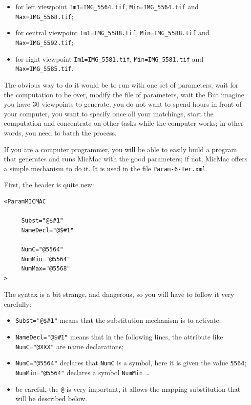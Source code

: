 \begin{itemize}
   \item  for left viewpoint {\tt Im1=IMG\_5564.tif}, {\tt Min=IMG\_5564.tif} and {\tt Max=IMG\_5568.tif};
   \item  for central viewpoint {\tt Im1=IMG\_5588.tif}, {\tt Min=IMG\_5588.tif} and {\tt Max=IMG\_5592.tif};
   \item  for right viewpoint {\tt Im1=IMG\_5581.tif}, {\tt Min=IMG\_5581.tif} and {\tt Max=IMG\_5585.tif}.
\end{itemize}


The obvious way to do it would be to run with one set of parameters, wait for the computation to be over,
modify the file of parameters, wait the \UNCLEAR{\dots} %
But imagine you have $30$ viewpoints to generate,
you do not want to spend hours in front of your computer, you want to specify once all your
matchings, start the computation and concentrate on other tasks while the computer works;
in other words, you need to batch the process.

If you are a computer programmer, you will be able to
easily build a program that generates and runs MicMac with the good parameters; if
not, MicMac offers a simple mechanism to do it. It is used
in the file {\tt Param-6-Ter.xml}.

First, the header is quite new:

{\scriptsize
\begin{verbatim}
<ParamMICMAC

     Subst="@$#1"
     NameDecl="@$#1"

     NumC="@5564"
     NumMin="@5564"
     NumMax="@5568"
>
\end{verbatim}
}

The syntax is a bit strange, and dangerous, so you will have to follow it
very carefully:

\begin{itemize}
   \item  {\tt Subst="@\$\#1"}  means that the substitution mechanism is to activate;

   \item  {\tt  NameDecl="@\$\#1"}  means that in the following lines, the attribute
         like {\tt NumC="@XXX"} are name declarations;

   \item  {\tt  NumC="@5564"}  declares that {\tt NumC} is a symbol, here  it is given the
          value {\tt 5564};  {\tt NumMin="@5564"} declares a symbol {\tt NumMin} \dots

   \item  be careful, the {\tt @} is very important, it allows the mapping substitution
          that will be described below.
\end{itemize}


